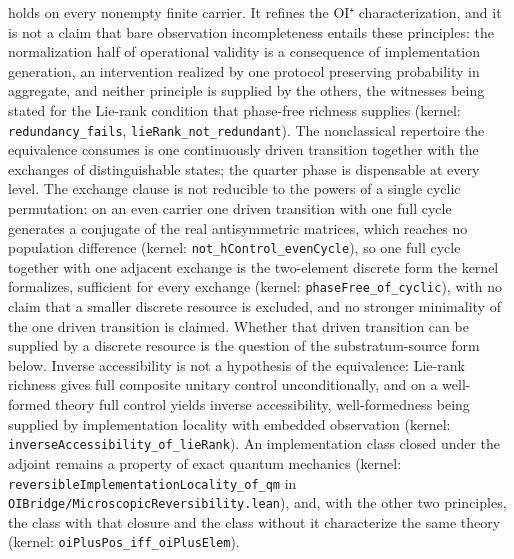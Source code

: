 \documentclass[
]{article}
\begin{document}
holds on every nonempty finite carrier. It refines the OI⁺
characterization, and it is not a claim that bare observation
incompleteness entails these principles: the normalization half of
operational validity is a consequence of implementation generation, an
intervention realized by one protocol preserving probability in
aggregate, and neither principle is supplied by the others, the
witnesses being stated for the Lie-rank condition that phase-free
richness supplies (kernel: \texttt{redundancy\_fails},
\texttt{lieRank\_not\_redundant}). The nonclassical repertoire the
equivalence consumes is one continuously driven transition together with
the exchanges of distinguishable states; the quarter phase is
dispensable at every level. The exchange clause is not reducible to the
powers of a single cyclic permutation: on an even carrier one driven
transition with one full cycle generates a conjugate of the real
antisymmetric matrices, which reaches no population difference (kernel:
\texttt{not\_hControl\_evenCycle}), so one full cycle together with one
adjacent exchange is the two-element discrete form the kernel
formalizes, sufficient for every exchange (kernel:
\texttt{phaseFree\_of\_cyclic}), with no claim that a smaller discrete
resource is excluded, and no stronger minimality of the one driven
transition is claimed. Whether that driven transition can be supplied by
a discrete resource is the question of the substratum-source form below.
Inverse accessibility is not a hypothesis of the equivalence: Lie-rank
richness gives full composite unitary control unconditionally, and on a
well-formed theory full control yields inverse accessibility,
well-formedness being supplied by implementation locality with embedded
observation (kernel: \texttt{inverseAccessibility\_of\_lieRank}). An
implementation class closed under the adjoint remains a property of
exact quantum mechanics (kernel:
\texttt{reversibleImplementationLocality\_of\_qm} in
\texttt{OIBridge/MicroscopicReversibility.lean}), and, with the other
two principles, the class with that closure and the class without it
characterize the same theory (kernel:
\texttt{oiPlusPos\_iff\_oiPlusElem}).
\end{document}
